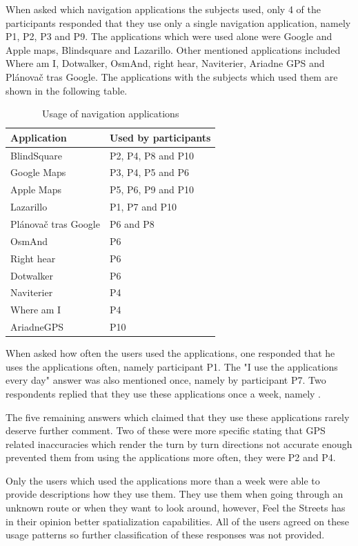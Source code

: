 \documentclass[nolof,digital]{fithesis3}
\begin{document}
When asked which navigation applications the subjects used, only 4 of the participants responded that they use only a single navigation application, namely P1, P2, P3 and P9. The applications which were used alone were Google and Apple maps, Blindsquare and Lazarillo. Other mentioned applications included Where am I, Dotwalker, OsmAnd, right hear, Naviterier, Ariadne GPS and Plánovač tras Google. The applications with the subjects which used them are shown in the following table.

\begin{table}
\caption{Usage of navigation applications}
\begin{tabularx}{\textwidth}{|X|X|}
Application & Used by participants \\
\hline
BlindSquare \parencite{blindsquare} & P2, P4, P8 and P10 \\
Google Maps \parencite{googlemaps} & P3, P4, P5 and P6 \\
Apple Maps \parencite{applemaps} & P5, P6, P9 and P10 \\
Lazarillo \parencite{lazarillo} & P1, P7 and P10 \\
Plánovač tras Google \parencite{ptg} & P6 and P8 \\
OsmAnd \parencite{osmand} & P6 \\
Right hear \parencite{righthear} & P6 \\
Dotwalker \parencite{dotwalker} & P6 \\
Naviterier \parencite{naviterier} & P4 \\
Where am I \parencite{whereami} & P4 \\
AriadneGPS \parencite{ariadnegps} & P10 \\
\end{tabularx}
\end{table}

When asked how often the users used the applications, one responded that he uses the applications often, namely participant P1. The "I use the applications every day" answer was also mentioned once, namely by participant P7. Two respondents replied that they use these applications once a week, namely .

The five remaining answers which claimed that they use these applications rarely deserve further comment. Two of these were more specific stating that GPS related inaccuracies which render the turn by turn directions not accurate enough prevented them from using the applications more often, they were P2 and P4.

Only the users which used the applications more than a week were able to provide descriptions how they use them. They use them when going through an unknown route or when they want to look around, however, Feel the Streets has in their opinion better spatialization capabilities. All of the users agreed on these usage patterns so further classification of these responses was not provided.
\end{document}
